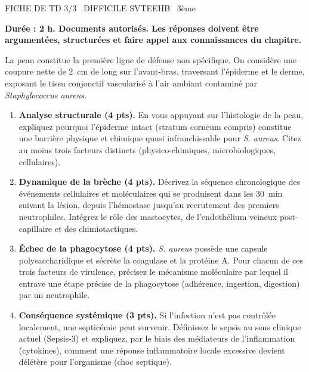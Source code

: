 \documentclass[11pt]{article}
\begin{document}
\begin{tcolorbox}[enhanced,colback=popink,colframe=popink,arc=10pt,boxrule=0pt,left=12pt,right=12pt,top=9pt,bottom=9pt]
{\color{white}\popxbold\small FICHE DE TD 3/3 \textbullet\ DIFFICILE \hfill SVTEEHB \textbullet\ 3ème\par}
\end{tcolorbox}
\vspace{4pt}
\textbf{Durée : 2 h. Documents autorisés. Les réponses doivent être argumentées, structurées et faire appel aux connaissances du chapitre.}

\begin{exercice}
La peau constitue la première ligne de défense non spécifique. On considère une coupure nette de \SI{2}{\centi\meter} de long sur l'avant-bras, traversant l'épiderme et le derme, exposant le tissu conjonctif vascularisé à l'air ambiant contaminé par \textit{Staphylococcus aureus}.

\begin{enumerate}
    \item \textbf{Analyse structurale (4 pts).} En vous appuyant sur l'histologie de la peau, expliquez pourquoi l'épiderme intact (stratum corneum compris) constitue une barrière physique et chimique quasi infranchissable pour \textit{S. aureus}. Citez au moins trois facteurs distincts (physico-chimiques, microbiologiques, cellulaires).
    
    \item \textbf{Dynamique de la brèche (4 pts).} Décrivez la séquence chronologique des événements cellulaires et moléculaires qui se produisent dans les \SI{30}{\minute} suivant la lésion, depuis l'hémostase jusqu'au recrutement des premiers neutrophiles. Intégrez le rôle des mastocytes, de l'endothélium veineux post-capillaire et des chimiotactiques.
    
    \item \textbf{Échec de la phagocytose (4 pts).} \textit{S. aureus} possède une capsule polysaccharidique et sécrète la coagulase et la protéine A. Pour chacun de ces trois facteurs de virulence, précisez le mécanisme moléculaire par lequel il entrave une étape précise de la phagocytose (adhérence, ingestion, digestion) par un neutrophile.
    
    \item \textbf{Conséquence systémique (3 pts).} Si l'infection n'est pas contrôlée localement, une septicémie peut survenir. Définissez le sepsis au sens clinique actuel (Sepsis-3) et expliquez, par le biais des médiateurs de l'inflammation (cytokines), comment une réponse inflammatoire locale excessive devient délétère pour l'organisme (choc septique).
\end{enumerate}
\end{exercice}
\end{document}

